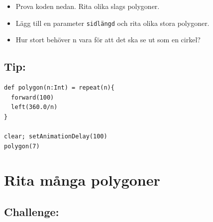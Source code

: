 \begin{itemize}

\item {Prova koden nedan. Rita olika slags polygoner.}
\item {Lägg till en parameter \lstinline{sidlängd} och rita olika stora polygoner.}
\item {Hur stort behöver n vara för att det ska se ut som en cirkel?}

\end{itemize}


\section*{\color{OliveGreen}Tip:}

\begin{lstlisting}[basicstyle={\ttfamily\fontsize{18}{22}\selectfont},numbers=none]
def polygon(n:Int) = repeat(n){
  forward(100)
  left(360.0/n)
}

clear; setAnimationDelay(100)
polygon(7)
\end{lstlisting}
        

  
\chapter{Rita många polygoner}\section*{\color{BrickRed}Challenge:}


